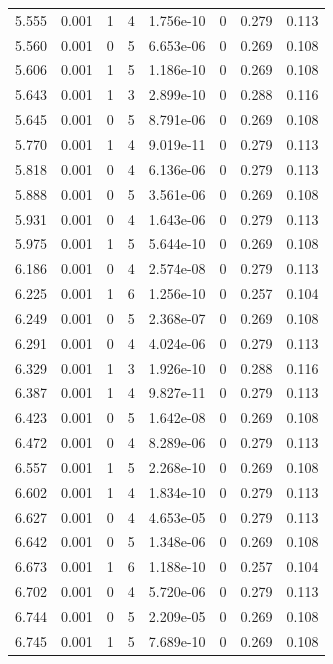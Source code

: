\documentclass[preview]{standalone}
\begin{document}
{{{\begin{tabular}{L{1.2cm}C{1.2cm} C{0.3cm}C{0.5cm} C{1.4cm}C{1.4cm} C{1.4cm}C{1.4cm}}
  5.555  &  0.001  & 1     &  4 &  1.756e-10  & 0  & 0.279 &  0.113   \\ 
  5.560  &  0.001  & 0     &  5 &  6.653e-06  & 0  & 0.269 &  0.108   \\ 
  5.606  &  0.001  & 1     &  5 &  1.186e-10  & 0  & 0.269 &  0.108   \\ 
  5.643  &  0.001  & 1     &  3 &  2.899e-10  & 0  & 0.288 &  0.116   \\ 
  5.645  &  0.001  & 0     &  5 &  8.791e-06  & 0  & 0.269 &  0.108   \\ 
  5.770  &  0.001  & 1     &  4 &  9.019e-11  & 0  & 0.279 &  0.113   \\ 
  5.818  &  0.001  & 0     &  4 &  6.136e-06  & 0  & 0.279 &  0.113   \\ 
  5.888  &  0.001  & 0     &  5 &  3.561e-06  & 0  & 0.269 &  0.108   \\ 
  5.931  &  0.001  & 0     &  4 &  1.643e-06  & 0  & 0.279 &  0.113   \\ 
  5.975  &  0.001  & 1     &  5 &  5.644e-10  & 0  & 0.269 &  0.108   \\ 
  6.186  &  0.001  & 0     &  4 &  2.574e-08  & 0  & 0.279 &  0.113   \\ 
  6.225  &  0.001  & 1     &  6 &  1.256e-10  & 0  & 0.257 &  0.104   \\ 
  6.249  &  0.001  & 0     &  5 &  2.368e-07  & 0  & 0.269 &  0.108   \\ 
  6.291  &  0.001  & 0     &  4 &  4.024e-06  & 0  & 0.279 &  0.113   \\ 
  6.329  &  0.001  & 1     &  3 &  1.926e-10  & 0  & 0.288 &  0.116   \\ 
  6.387  &  0.001  & 1     &  4 &  9.827e-11  & 0  & 0.279 &  0.113   \\ 
  6.423  &  0.001  & 0     &  5 &  1.642e-08  & 0  & 0.269 &  0.108   \\ 
  6.472  &  0.001  & 0     &  4 &  8.289e-06  & 0  & 0.279 &  0.113   \\ 
  6.557  &  0.001  & 1     &  5 &  2.268e-10  & 0  & 0.269 &  0.108   \\ 
  6.602  &  0.001  & 1     &  4 &  1.834e-10  & 0  & 0.279 &  0.113   \\ 
  6.627  &  0.001  & 0     &  4 &  4.653e-05  & 0  & 0.279 &  0.113   \\ 
  6.642  &  0.001  & 0     &  5 &  1.348e-06  & 0  & 0.269 &  0.108   \\ 
  6.673  &  0.001  & 1     &  6 &  1.188e-10  & 0  & 0.257 &  0.104   \\ 
  6.702  &  0.001  & 0     &  4 &  5.720e-06  & 0  & 0.279 &  0.113   \\ 
  6.744  &  0.001  & 0     &  5 &  2.209e-05  & 0  & 0.269 &  0.108   \\ 
  6.745  &  0.001  & 1     &  5 &  7.689e-10  & 0  & 0.269 &  0.108   \\ 
\hline 
\end{tabular} 

}}}
\end{document}
